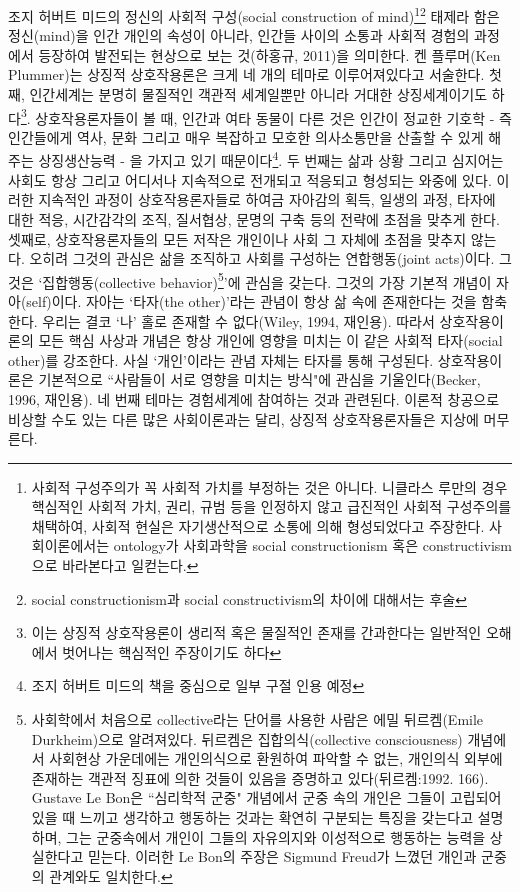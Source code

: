 \documentclass[12pt, a4paper]{article}
\begin{document}
조지 허버트 미드의 정신의 사회적 구성(social construction of mind)\footnote{사회적 구성주의가 꼭 사회적 가치를 부정하는 것은 아니다. 니클라스 루만의 경우 핵심적인 사회적 가치, 권리, 규범 등을 인정하지 않고 급진적인 사회적 구성주의를 채택하여, 사회적 현실은 자기생산적으로 소통에 의해 형성되었다고 주장한다. 사회이론에서는 ontology가 사회과학을 social constructionism 혹은 constructivism으로 바라본다고 일컫는다.}\footnote{social constructionism과 social constructivism의 차이에 대해서는 후술} 태제라 함은 정신(mind)을 인간 개인의 속성이 아니라, 인간들 사이의 소통과 사회적 경험의 과정에서 등장하여 발전되는 현상으로 보는 것(하홍규, 2011)을 의미한다. 켄 플루머(Ken Plummer)는 상징적 상호작용론은 크게 네 개의 테마로 이루어져있다고 서술한다. 첫째, 인간세계는 분명히 물질적인 객관적 세계일뿐만 아니라 거대한 상징세계이기도 하다\footnote{이는 상징적 상호작용론이 생리적 혹은 물질적인 존재를 간과한다는 일반적인 오해에서 벗어나는 핵심적인 주장이기도 하다}. 상호작용론자들이 볼 때, 인간과 여타 동물이 다른 것은 인간이 정교한 기호학 - 즉 인간들에게 역사, 문화 그리고 매우 복잡하고 모호한 의사소통만을 산출할 수 있게 해 주는 상징생산능력 - 을 가지고 있기 때문이다\footnote{조지 허버트 미드의 책을 중심으로 일부 구절 인용 예정}. 두 번째는 삶과 상황 그리고 심지어는 사회도 항상 그리고 어디서나 지속적으로 전개되고 적응되고 형성되는 와중에 있다. 이러한 지속적인 과정이 상호작용론자들로 하여금 자아감의 획득, 일생의 과정, 타자에 대한 적응, 시간감각의 조직, 질서협상, 문명의 구축 등의 전략에 초점을 맞추게 한다. 셋째로, 상호작용론자들의 모든 저작은 개인이나 사회 그 자체에 초점을 맞추지 않는다. 오히려 그것의 관심은 삶을 조직하고 사회를 구성하는 연합행동(joint acts)이다. 그것은 `집합행동(collective behavior)\footnote{사회학에서 처음으로 collective라는 단어를 사용한 사람은 에밀 뒤르켐(Emile Durkheim)으로 알려져있다. 뒤르켐은 집합의식(collective consciousness) 개념에서 사회현상 가운데에는 개인의식으로 환원하여 파악할 수 없는, 개인의식 외부에 존재하는 객관적 징표에 의한 것들이 있음을 증명하고 있다(뒤르켐:1992. 166). Gustave Le Bon은 ``심리학적 군중" 개념에서 군중 속의 개인은 그들이 고립되어 있을 때 느끼고 생각하고 행동하는 것과는 확연히 구분되는 특징을 갖는다고 설명하며, 그는 군중속에서 개인이 그들의 자유의지와 이성적으로 행동하는 능력을 상실한다고 믿는다. 이러한 Le Bon의 주장은 Sigmund Freud가 느꼈던 개인과 군중의 관계와도 일치한다.}'에 관심을 갖는다. 그것의 가장 기본적 개념이 자아(self)이다. 자아는 `타자(the other)'라는 관념이 항상 삶 속에 존재한다는 것을 함축한다. 우리는 결코 `나' 홀로 존재할 수 없다(Wiley, 1994, 재인용). 따라서 상호작용이론의 모든 핵심 사상과 개념은 항상 개인에 영향을 미치는 이 같은 사회적 타자(social other)를 강조한다. 사실 `개인'이라는 관념 자체는 타자를 통해 구성된다. 상호작용이론은 기본적으로 ``사람들이 서로 영향을 미치는 방식"에 관심을 기울인다(Becker, 1996, 재인용). 네 번째 테마는 경험세계에 참여하는 것과 관련된다. 이론적 창공으로 비상할 수도 있는 다른 많은 사회이론과는 달리, 상징적 상호작용론자들은 지상에 머무른다.
\end{document}
